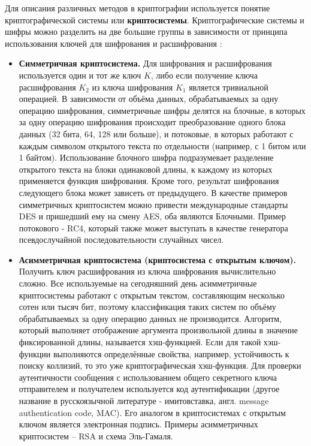 Для описания различных методов в криптографии используется понятие криптографической системы или
\textbf{криптосистемы}.
Криптографические системы и шифры можно разделить на две большие группы в зависимости от принципа
использования ключей для шифрования и расшифрования \cite{crypto-methods}:
\begin{itemize}
    \item \textbf{Симметричная криптосистема.} Для шифрования и расшифрования используется один и
        тот же ключ $\mathit{K}$, либо если получение ключа расшифрования $\mathit{K_2}$ из ключа
        шифрования $\mathit{K_1}$ является тривиальной операцией. В зависимости от объёма данных,
        обрабатываемых за одну операцию шифрования, симметричные шифры делятся на блочные, в
        которых за одну операцию шифрования происходит преобразование одного блока данных (32 бита,
        64, 128 или больше), и потоковые, в которых работают с каждым символом открытого текста по
        отдельности (например, с 1 битом или 1 байтом). Использование блочного шифра подразумевает
        разделение открытого текста на блоки одинаковой длины, к каждому из которых применяется
        функция шифрования. Кроме того, результат шифрования следующего блока может зависеть от
        предыдущего. В качестве примеров симметричных криптосистем можно привести международные
        стандарты DES и пришедший ему на смену AES, оба являются Блочными. Пример потокового - RC4,
        который также может выступать в качестве генератора псевдослучайной последовательности
        случайных чисел.
    \item \textbf{Асимметричная криптосистема (криптосистема с открытым ключом).} Получить ключ
        расшифрования из ключа шифрования вычислительно сложно. Все используемые на сегодняшний
        день асимметричные криптосистемы работают с
        открытым текстом, составляющим несколько сотен или тысяч бит, поэтому классификация таких
        систем по объёму обрабатываемых за одну операцию данных не производится. Алгоритм, который
        выполняет отображение аргумента произвольной длины в значение фиксированной длины,
        называется хэш-функцией. Если для такой хэш-функции выполняются определённые свойства,
        например, устойчивость к поиску коллизий, то это уже криптографическая хэш-функция.
        Для проверки аутентичности сообщения с использованием общего секретного ключа
        отправителем и получателем используется код аутентификации (другое название в
        русскоязычной литературе - имитовставка, англ. message authentication code, MAC).
        Его аналогом в криптосистемах с открытым ключом является
        электронная подпись. Примеры асимметричных криптосистем – RSA и схема Эль-Гамаля.
\end{itemize}

